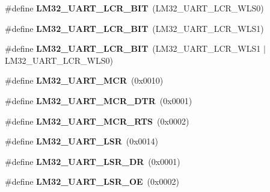 \begin{DoxyCompactItemize}
\item 
\mbox{\label{group__lm32__uart_ga6f62e2e25a5a0e2911700806ed1a1026}} 
\#define {\bfseries L\+M32\+\_\+\+U\+A\+R\+T\+\_\+\+L\+C\+R\+\_\+B\+IT}~(L\+M32\+\_\+\+U\+A\+R\+T\+\_\+\+L\+C\+R\+\_\+\+W\+L\+S0)
\item 
\mbox{\label{group__lm32__uart_gac64b0227db16177640f51b08f5e3e062}} 
\#define {\bfseries L\+M32\+\_\+\+U\+A\+R\+T\+\_\+\+L\+C\+R\+\_\+B\+IT}~(L\+M32\+\_\+\+U\+A\+R\+T\+\_\+\+L\+C\+R\+\_\+\+W\+L\+S1)
\item 
\mbox{\label{group__lm32__uart_ga6d2b002a2e3fe8599620bd1a4998cad7}} 
\#define {\bfseries L\+M32\+\_\+\+U\+A\+R\+T\+\_\+\+L\+C\+R\+\_\+B\+IT}~(L\+M32\+\_\+\+U\+A\+R\+T\+\_\+\+L\+C\+R\+\_\+\+W\+L\+S1 $\vert$ L\+M32\+\_\+\+U\+A\+R\+T\+\_\+\+L\+C\+R\+\_\+\+W\+L\+S0)
\item 
\mbox{\label{group__lm32__uart_ga8ec4df77b9f8043ceb0d352c1520783d}} 
\#define {\bfseries L\+M32\+\_\+\+U\+A\+R\+T\+\_\+\+M\+CR}~(0x0010)
\item 
\mbox{\label{group__lm32__uart_ga11fdf4a1e60ce8eb14d557c39c57d268}} 
\#define {\bfseries L\+M32\+\_\+\+U\+A\+R\+T\+\_\+\+M\+C\+R\+\_\+\+D\+TR}~(0x0001)
\item 
\mbox{\label{group__lm32__uart_ga692956a6d9e345d833aeba58e7a7e91b}} 
\#define {\bfseries L\+M32\+\_\+\+U\+A\+R\+T\+\_\+\+M\+C\+R\+\_\+\+R\+TS}~(0x0002)
\item 
\mbox{\label{group__lm32__uart_ga3017c50e642577a9df77157aed3d5bcf}} 
\#define {\bfseries L\+M32\+\_\+\+U\+A\+R\+T\+\_\+\+L\+SR}~(0x0014)
\item 
\mbox{\label{group__lm32__uart_ga0d03252f7846f5d802f9f22a5a74f438}} 
\#define {\bfseries L\+M32\+\_\+\+U\+A\+R\+T\+\_\+\+L\+S\+R\+\_\+\+DR}~(0x0001)
\item 
\mbox{\label{group__lm32__uart_ga716d25634fe06f8db09c515a559e6e1b}} 
\#define {\bfseries L\+M32\+\_\+\+U\+A\+R\+T\+\_\+\+L\+S\+R\+\_\+\+OE}~(0x0002)
\item 

\end{DoxyCompactItemize}
